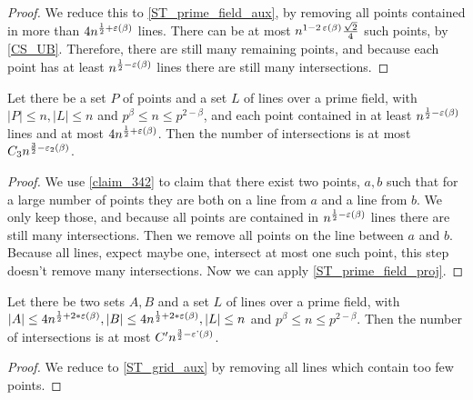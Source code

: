 \begin{proof}
    \leanok
    We reduce this to \ref{ST_prime_field_aux}, by removing all points contained in more than 
    $4 n^{\frac12 + \operatorname{\varepsilon}(\beta)}$ lines. There can be at most
    $n^{1 - 2 \operatorname{\varepsilon}(\beta)} \frac{\sqrt2}4$ such points, by \ref{CS_UB}.
    Therefore, there are still many remaining points, and because each point has at least
    $n^{\frac12 - \operatorname{\varepsilon}(\beta)}$ lines there are still many intersections.
\end{proof}

\begin{theorem}
    \label{ST_prime_field_aux}
    \leanok
    Let there be a set $P$ of points and a set $L$ of lines over a prime field, 
    with $|P| \leq n, |L| \leq n$ and $p^\beta \leq n \leq p^{2 - \beta}$,
    and each point contained in at least $n^{\frac12 - \operatorname{\varepsilon}(\beta)}$ lines
    and at most $4 n^{\frac12 + \operatorname{\varepsilon}(\beta)}$.
    Then the number of intersections is at most $C_3 n^{\frac32 - \operatorname{\varepsilon_2}(\beta)}$.
\end{theorem}

\begin{proof}
    \leanok
    We use \ref{claim_342} to claim that there exist two points, $a, b$ such that for a large number of 
    points they are both on a line from $a$ and a line from $b$.
    We only keep those, and because all points are contained in $n^{\frac12 - \operatorname{\varepsilon}(\beta)}$ lines there are still many intersections.
    Then we remove all points on the line between $a$ and $b$. Because all lines, expect maybe one, intersect at most one such point,
    this step doesn't remove many intersections.
    Now we can apply \ref{ST_prime_field_proj}.
\end{proof}

\begin{theorem}
    \label{ST_grid}
    \leanok
    Let there be two sets $A, B$ and a set $L$ of lines over a prime field, 
    with $|A| \leq 4n^{\frac12 + 2*\operatorname{\varepsilon}(\beta)}, |B| \leq 4n^{\frac12 + 2*\operatorname{\varepsilon}(\beta)}, |L| \leq n$ and $p^\beta \leq n \leq p^{2 - \beta}$.
    Then the number of intersections is at most $C' n^{\frac32 - \operatorname{\varepsilon'}(\beta)}$.
\end{theorem}

\begin{proof}
    \leanok
    We reduce to \ref{ST_grid_aux} by removing all lines which contain too few points.
\end{proof}

